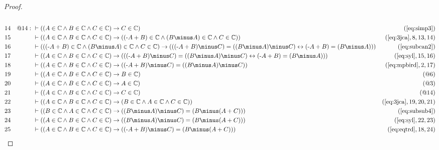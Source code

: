 \begin{proof}
\begin{align}
  \\ 14 && @14:\  & \vdash ( ( A \in \mathbb{C} \wedge B \in \mathbb{C} \wedge C \in \mathbb{C} ) \rightarrow C \in \mathbb{C} )&(\mbox{\ref{eq:simp3}})\notag
  \\ 15 &&  & \vdash ( ( A \in \mathbb{C} \wedge B \in \mathbb{C} \wedge C \in \mathbb{C} ) \rightarrow ( ( \textrm{-} A + B ) \in \mathbb{C} \wedge ( B \minus A ) \in \mathbb{C} \wedge C \in \mathbb{C} ) )&(\mbox{\ref{eq:3jca}},8,13,14)\notag
  \\ 16 &&  & \vdash ( ( ( \textrm{-} A + B ) \in \mathbb{C} \wedge ( B \minus A ) \in \mathbb{C} \wedge C \in \mathbb{C} ) \rightarrow ( ( ( \textrm{-} A + B ) \minus C ) = ( ( B \minus A ) \minus C ) \leftrightarrow ( \textrm{-} A + B ) = ( B \minus A ) ) )&(\mbox{\ref{eq:subcan2}})\notag
  \\ 17 &&  & \vdash ( ( A \in \mathbb{C} \wedge B \in \mathbb{C} \wedge C \in \mathbb{C} ) \rightarrow ( ( ( \textrm{-} A + B ) \minus C ) = ( ( B \minus A ) \minus C ) \leftrightarrow ( \textrm{-} A + B ) = ( B \minus A ) ) )&(\mbox{\ref{eq:syl}},15,16)\notag
  \\ 18 &&  & \vdash ( ( A \in \mathbb{C} \wedge B \in \mathbb{C} \wedge C \in \mathbb{C} ) \rightarrow ( ( \textrm{-} A + B ) \minus C ) = ( ( B \minus A ) \minus C ) )&(\mbox{\ref{eq:mpbird}},2,17)\notag
  \\ 19 &&  & \vdash ( ( A \in \mathbb{C} \wedge B \in \mathbb{C} \wedge C \in \mathbb{C} ) \rightarrow B \in \mathbb{C} )&(@6)\notag
  \\ 20 &&  & \vdash ( ( A \in \mathbb{C} \wedge B \in \mathbb{C} \wedge C \in \mathbb{C} ) \rightarrow A \in \mathbb{C} )&(@3)\notag
  \\ 21 &&  & \vdash ( ( A \in \mathbb{C} \wedge B \in \mathbb{C} \wedge C \in \mathbb{C} ) \rightarrow C \in \mathbb{C} )&(@14)\notag
  \\ 22 &&  & \vdash ( ( A \in \mathbb{C} \wedge B \in \mathbb{C} \wedge C \in \mathbb{C} ) \rightarrow ( B \in \mathbb{C} \wedge A \in \mathbb{C} \wedge C \in \mathbb{C} ) )&(\mbox{\ref{eq:3jca}},19,20,21)\notag
  \\ 23 &&  & \vdash ( ( B \in \mathbb{C} \wedge A \in \mathbb{C} \wedge C \in \mathbb{C} ) \rightarrow ( ( B \minus A ) \minus C ) = ( B \minus ( A + C ) ) )&(\mbox{\ref{eq:subsub4}})\notag
  \\ 24 &&  & \vdash ( ( A \in \mathbb{C} \wedge B \in \mathbb{C} \wedge C \in \mathbb{C} ) \rightarrow ( ( B \minus A ) \minus C ) = ( B \minus ( A + C ) ) )&(\mbox{\ref{eq:syl}},22,23)\notag
  \\ 25 &&  & \vdash ( ( A \in \mathbb{C} \wedge B \in \mathbb{C} \wedge C \in \mathbb{C} ) \rightarrow ( ( \textrm{-} A + B ) \minus C ) = ( B \minus ( A + C ) ) )&(\mbox{\ref{eq:eqtrd}},18,24)\notag
\end{align}
\end{proof}

